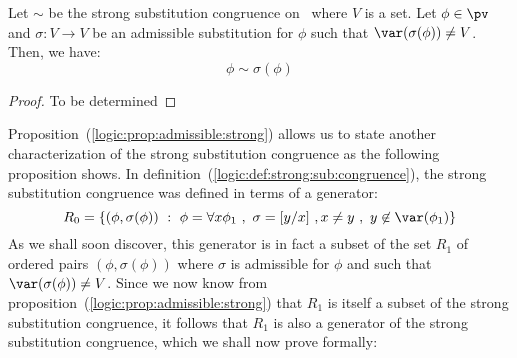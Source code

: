 \begin{prop}\label{logic:prop:admissible:strong}
Let $\sim$ be the strong substitution congruence on \pv\ where $V$
is a set. Let $\phi\in\pv$ and $\sigma:V\to V$ be an admissible
substitution for $\phi$ such that $\var(\sigma(\phi))\neq V$. Then,
we have:
    \[
    \phi\sim\sigma(\phi)
    \]
\end{prop}
\begin{proof}
To be determined
\end{proof}

Proposition~(\ref{logic:prop:admissible:strong}) allows us to state
another characterization of the strong substitution congruence as
the following proposition shows. In
definition~(\ref{logic:def:strong:sub:congruence}), the strong
substitution congruence was defined in terms of a generator:
 \[
    R_{0}=\{(\phi,\sigma(\phi))\ :\ \phi=\forall x\phi_{1}\ ,\
    \sigma=[y/x]\ ,x\neq y\ , \ y\not\in\var(\phi_{1})\}
 \]
As we shall soon discover, this generator is in fact a subset of the
set $R_{1}$ of ordered pairs $(\phi,\sigma(\phi))$ where $\sigma$ is
admissible for $\phi$ and such that $\var(\sigma(\phi))\neq V$.
Since we now know from
proposition~(\ref{logic:prop:admissible:strong}) that $R_{1}$ is
itself a subset of the strong substitution congruence, it follows
that $R_{1}$ is also a generator of the strong substitution
congruence, which we shall now prove formally:


